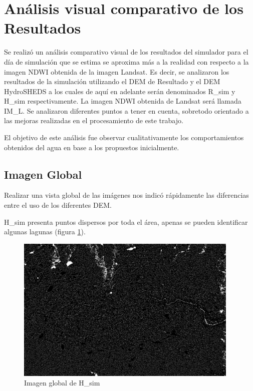 \documentclass[10pt,a4paper, twoside]{report}
\begin{document}
\section{Análisis visual comparativo de los Resultados}
\label{analisisVisual}

Se realizó un análisis comparativo visual de los resultados del simulador para el día de simulación que se estima se aproxima más a la realidad con respecto a la imagen NDWI obtenida de la imagen Landsat. Es decir, se analizaron los resultados de la simulación utilizando el DEM de Resultado y el DEM HydroSHEDS a los cuales de aquí en adelante serán denominados R\_sim y H\_sim respectivamente. La imagen NDWI obtenida de Landsat será llamada IM\_L. Se analizaron diferentes puntos a tener en cuenta, sobretodo orientado a las mejoras realizadas en el procesamiento de este trabajo.

El objetivo de este análisis fue observar cualitativamente los comportamientos obtenidos del agua en base a los propuestos inicialmente.

\subsection{Imagen Global}

Realizar una vista global de las imágenes nos indicó rápidamente las diferencias entre el uso de los diferentes DEM.


H\_sim presenta puntos dispersos por toda el área, apenas se pueden identificar algunas lagunas (figura \ref{HSHEDSGlobal}).

\begin{figure}[!htb]
   \centering      
   \includegraphics[width=0.95\textwidth]{imagenes/HSHEDSGlobal.jpg}
 \caption{Imagen global de H\_sim}
 \label{HSHEDSGlobal}
\end{figure}
\end{document}
